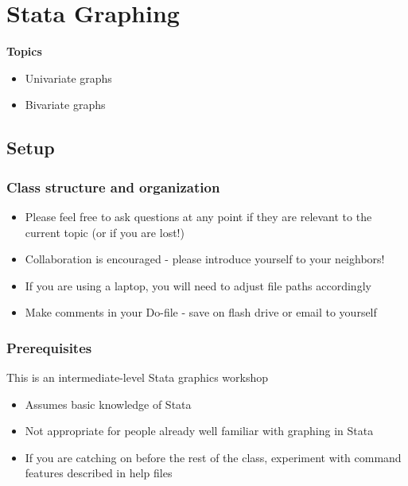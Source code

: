 \documentclass[
]{book}
\providecommand{\tightlist}{%
  \setlength{\itemsep}{0pt}\setlength{\parskip}{0pt}}
\begin{document}
\hypertarget{stata-graphing}{%
\chapter{Stata Graphing}\label{stata-graphing}}

\textbf{Topics}

\begin{itemize}
\tightlist
\item
  Univariate graphs
\item
  Bivariate graphs
\end{itemize}

\hypertarget{setup-9}{%
\section{Setup}\label{setup-9}}

\hypertarget{class-structure-and-organization-3}{%
\subsection{Class structure and organization}\label{class-structure-and-organization-3}}

\begin{itemize}
\tightlist
\item
  Please feel free to ask questions at any point if they are relevant to the current topic (or if you are lost!)
\item
  Collaboration is encouraged - please introduce yourself to your neighbors!
\item
  If you are using a laptop, you will need to adjust file paths accordingly
\item
  Make comments in your Do-file - save on flash drive or email to yourself
\end{itemize}

\hypertarget{prerequisites-9}{%
\subsection{Prerequisites}\label{prerequisites-9}}

This is an intermediate-level Stata graphics workshop

\begin{itemize}
\tightlist
\item
  Assumes basic knowledge of Stata
\item
  Not appropriate for people already well familiar with graphing in Stata
\item
  If you are catching on before the rest of the class, experiment with command features described in help files
\end{itemize}
\end{document}
